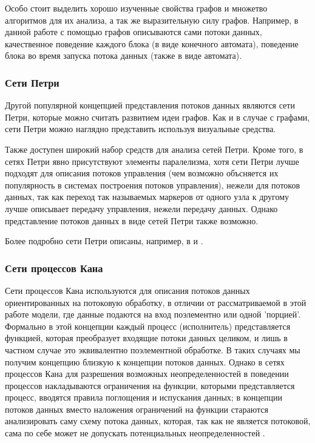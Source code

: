 \documentclass[10pt,a4paper]{article}
\begin{document}
Особо стоит выделить хорошо изученные свойства графов и множетво алгоритмов для их анализа, а так же выразительную силу графов.
Например, в данной работе с помощью графов описываются сами потоки данных, качественное поведение каждого блока (в виде конечного автомата),
поведение блока во время запуска потока данных (также в виде автомата).

\subsubsection{Сети Петри}
Другой популярной концепцией представления потоков данных являются сети Петри, которые можно считать развитием идеи графов.
Как и в случае с графами, сети Петри можно наглядно представить используя визуальные средства.

Также доступен широкий набор средств для анализа сетей Петри. Кроме того, в сетях Петри явно присутствуют элементы паралелизма,
хотя сети Петри лучше подходят для описания потоков управления (чем возможно объсняется их популярность в системах построения потоков управления),
нежели для потоков данных, так как переход так называемых маркеров от одного узла к другому лучше
описывает передачу управления, нежели передачу данных. Однако представление потоков данных в виде сетей Петри также возможно.

Более подробно сети Петри описаны, например, в \cite{analysing-control-work-flow} и \cite{workflow-managment}.

\subsubsection{Сети процессов Кана}
Сети процессов Кана используются для описания потоков данных ориентированных на потоковую обработку, в отличии от рассматриваемой в этой работе
модели, где данные подаются на вход поэлементно или одной 'порцией'.
Формально в этой концепции каждый процесс (исполнитель) представляется функцией, которая преобразует входящие потоки данных целиком, и лишь
в частном случае это эквивалентно поэлементной обработке.
В таких случаях мы получим концепцию близкую к концепции потоков данных. Однако в сетях процессов Кана для разрешения возможных неопределенностей в 
поведении процессов накладываются ограничения на функции, которыми представляется процесс, вводятся правила поглощения и испускания данных; в концепции потоков данных вместо наложения ограничений на функции стараются анализировать саму схему потока данных, которая, так как не является потоковой, сама по себе может не допускать потенциальных неопределенностей \cite{data-flow-process-networks}.
\end{document}

